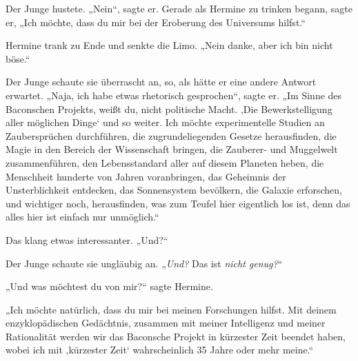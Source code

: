 Der Junge hustete. „Nein“, sagte er. Gerade als Hermine zu trinken begann, sagte er, „Ich möchte, dass du mir bei der Eroberung des Universums hilfst.“

Hermine trank zu Ende und senkte die Limo. „Nein danke, aber ich bin nicht böse.“

Der Junge schaute sie überrascht an, so, als hätte er eine andere Antwort erwartet. „Naja, ich habe etwas rhetorisch gesprochen“, sagte er. „Im Sinne des Baconschen Projekts, weißt du, nicht politische Macht. ‚Die Bewerkstelligung aller möglichen Dinge‘ und so weiter. Ich möchte experimentelle Studien an Zaubersprüchen durchführen, die zugrundeliegenden Gesetze herausfinden, die Magie in den Bereich der Wissenschaft bringen, die Zauberer- und Muggelwelt zusammenführen, den Lebensstandard aller auf diesem Planeten heben, die Menschheit hunderte von Jahren voranbringen, das Geheimnis der Unsterblichkeit entdecken, das Sonnensystem bevölkern, die Galaxie erforschen, und wichtiger noch, herausfinden, was zum Teufel hier eigentlich los ist, denn das alles hier ist einfach nur unmöglich.“

Das klang etwas interessanter. „Und?“

Der Junge schaute sie ungläubig an. „\emph{Und?} Das ist \emph{nicht genug?}“

„Und was möchtest du von mir?“ sagte Hermine.

„Ich möchte natürlich, dass du mir bei meinen Forschungen hilfst. Mit deinem enzyklopädischen Gedächtnis, zusammen mit meiner Intelligenz und meiner Rationalität werden wir das Baconsche Projekt in kürzester Zeit beendet haben, wobei ich mit ‚kürzester Zeit‘ wahrscheinlich 35 Jahre oder mehr meine.“

